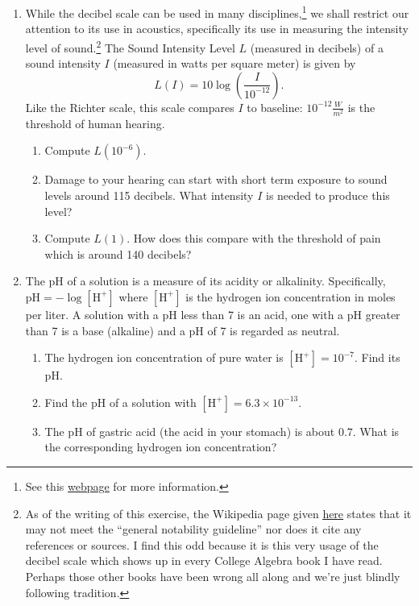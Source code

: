 \begin{enumerate}
\item \label{decibelexercise}   While the decibel scale can be used in many disciplines,\footnote{See this  \href{http://en.wikipedia.org/wiki/Decibel}{\underline{webpage}} for more information.} we shall restrict our attention to its use in acoustics, specifically its use in measuring the intensity level of sound.\footnote{As of the writing of this exercise, the Wikipedia page given \href{http://en.wikipedia.org/wiki/Sound_intensity_level}{\underline{here}} states that it may not meet the ``general notability guideline'' nor does it cite any references or sources.  I find this odd because it is this very usage of the decibel scale which shows up in every College Algebra book I have read.  Perhaps those other books have been wrong all along and we're just blindly following tradition.}  The Sound Intensity Level $L$ (measured in decibels) of a sound intensity $I$ (measured in watts per square meter) is given by \[L(I) = 10\log\left( \dfrac{I}{10^{-12}} \right).\] Like the Richter scale, this scale compares $I$ to baseline: $10^{-12} \frac{W}{m^{2}}$ is the threshold of human hearing. 

\begin{enumerate}

\item Compute $L(10^{-6})$.
\item Damage to your hearing can start with short term exposure to sound levels around 115 decibels.  What intensity $I$ is needed to produce this level? 
\item Compute $L(1)$.  How does this compare with the threshold of pain which is around 140 decibels?

\end{enumerate}

\item \label{pHexercise}    The pH of a solution is a measure of its acidity or alkalinity.  Specifically, $\mbox{pH} = -\log[\mbox{H}^{+}]$ where $[\mbox{H}^{+}]$ is the hydrogen ion concentration in moles per liter.  A solution with a pH less than 7 is an acid, one with a pH greater than 7 is a base (alkaline) and a pH of 7 is regarded as neutral.

\begin{enumerate}

\item The hydrogen ion concentration of pure water is $[\mbox{H}^{+}] = 10^{-7}$.  Find its pH.
\item Find the pH of a solution with $[\mbox{H}^{+}] = 6.3 \times 10^{-13}$.
\item The pH of gastric acid (the acid in your stomach) is about $0.7$.  What is the corresponding hydrogen ion concentration?

\end{enumerate}

\setcounter{HW}{\value{enumi}}
\end{enumerate}

